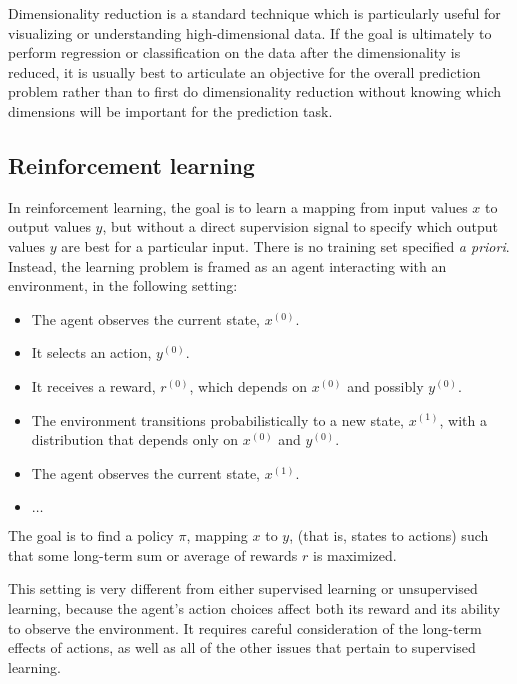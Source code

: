 \documentclass[11pt]{article}
\newcommand\ex[2]{#1^{(#2)}}
\begin{document}
Dimensionality reduction is a standard technique which is particularly useful for
visualizing or understanding high-dimensional data.  If the goal is
ultimately to perform regression or classification on the data after
the dimensionality is reduced, it is usually best to articulate an objective
for the overall prediction problem rather than to first do
dimensionality reduction without knowing which dimensions will be
important for the prediction task.

\subsection{Reinforcement learning}

In reinforcement learning, the goal is to learn a mapping from input
values $x$ to output values $y$, but without a direct supervision
signal to specify which output values $y$ are best for a particular
input.  There is no training set specified {\em a priori}.  Instead,
the learning problem is framed as an agent interacting with an
environment, in the following setting:
\begin{itemize}
\item The agent observes the current state, $\ex{x}{0}$.
\item It selects an action, $\ex{y}{0}$.
\item It receives a reward, $\ex{r}{0}$, which depends on $\ex{x}{0}$
  and possibly $\ex{y}{0}$.
\item The environment transitions probabilistically to a new state,
  $\ex{x}{1}$, with a distribution that depends only on $\ex{x}{0}$
  and $\ex{y}{0}$. 
\item The agent observes the current state, $\ex{x}{1}$.
\item $\ldots$
\end{itemize}
The goal is to find a policy $\pi$, mapping $x$ to $y$, (that is,
states to actions) such that some long-term sum or average of rewards
$r$ is maximized.

This setting is very different from either supervised learning or
unsupervised learning, because the agent's action choices affect both
its reward and its ability to observe the environment.  
It requires careful consideration of the long-term effects of actions,
as well as all of the other issues that pertain to supervised
learning.
\end{document}
